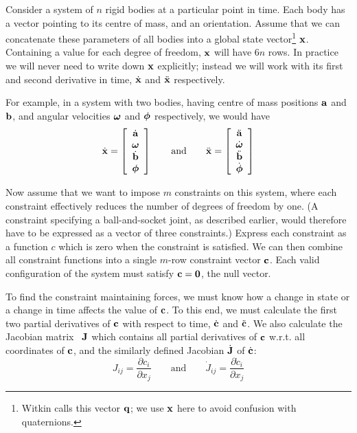 Consider a system of $n$ rigid bodies at a particular point in time. Each body has a vector
pointing to its centre of mass, and an orientation. Assume that we can concatenate these
parameters of all bodies into a global state vector\footnote{Witkin calls this vector
$\ve{q}$; we use $\ve{x}$ here to avoid confusion with quaternions.} $\ve{x}$.
Containing a value for each degree of freedom, $\ve{x}$ will have $6n$ rows. In practice
we will never need to write down $\ve{x}$ explicitly; instead we will work with its
first and second derivative in time, $\dot{\ve{x}}$ and $\ddot{\ve{x}}$ respectively.

For example, in a system with two bodies, having centre of mass positions $\ve{a}$ and
$\ve{b}$, and angular velocities $\ve{\omega}$ and $\ve{\phi}$ respectively, we would
have
\begin{equation}
\label{lagrangeStateVector}
\dot{\ve{x}} = \left[ \begin{array}{c}
    \dot{\ve{a}}\\ \ve{\omega}\\ \dot{\ve{b}}\\ \ve{\phi} \end{array}\right]
\quad\quad\mathrm{and}\quad\quad
\ddot{\ve{x}} = \left[ \begin{array}{c}
    \ddot{\ve{a}}\\ \dot{\ve{\omega}}\\ \ddot{\ve{b}}\\ \dot{\ve{\phi}} \end{array}\right]
\end{equation}

Now assume that we want to impose $m$ constraints on this system, where each constraint
effectively reduces the number of degrees of freedom by one. (A constraint specifying a
ball-and-socket joint, as described earlier, would therefore have to be expressed as a
vector of three constraints.) Express each constraint as a function $c$ which is zero
when the constraint is satisfied. We can then combine all constraint functions into a
single $m$-row constraint vector $\ve{c}$. Each valid configuration of the system must
satisfy $\ve{c} = \ve{0}$, the null vector.

To find the constraint maintaining forces, we must know how a change in state or a change in
time affects the value of $\ve{c}$. To this end, we must calculate the first two partial
derivatives of $\ve{c}$ with respect to time, $\dot{\ve{c}}$ and $\ddot{\ve{c}}$.
We also calculate the Jacobian matrix~\cite{RHB:02} $\m{J}$ which contains all partial
derivatives of $\ve{c}$ w.r.t. all coordinates of $\ve{c}$, and the similarly
defined Jacobian $\dot{\m{J}}$ of $\dot{\ve{c}}$:
\begin{equation}
J_{ij} = \frac{\partial c_i}{\partial x_j} \quad\quad\mathrm{and}\quad\quad
\dot{J}_{ij} = \frac{\partial \dot{c}_i}{\partial x_j}
\end{equation}

